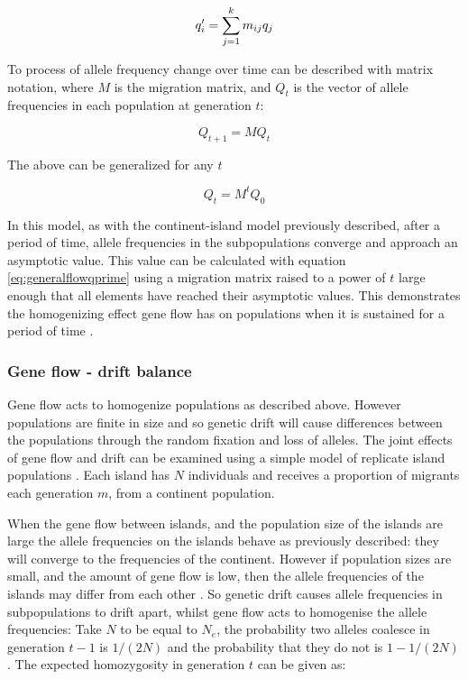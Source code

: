 \begin{equation} \label{eq:generalflowqprime}
q\sp{\prime}_i=\sum_{j=1}^k m_{ij}q_{j}
\end{equation}

To process of allele frequency change over time can be described with matrix notation, where $M$ is the migration matrix, and $Q_t$ is the vector of allele frequencies in each population at generation $t$:

\begin{equation}
Q_{t+1} = MQ_t
\end{equation}

The above can be generalized for any $t$

\begin{equation}
Q_t=M^tQ_0
\end{equation}

\parencite{Hedrick2010}

In this model, as with the continent-island model previously described, after a period of time, allele frequencies in the subpopulations converge and approach an asymptotic value.
This value can be calculated with equation \ref{eq:generalflowqprime} using a migration matrix raised to a power of $t$ large enough that all elements have reached their asymptotic values.
This demonstrates the homogenizing effect gene flow has on populations when it is sustained for a period of time \parencite{Charlesworth2010,Hedrick2010}.


\subsubsection{Gene flow - drift balance}

Gene flow acts to homogenize populations as described above.
However populations are finite in size and so genetic drift will cause differences between the populations through the random fixation and loss of alleles.
The joint effects of gene flow and drift can be examined using a simple model of replicate island populations \parencite{Wright1940}.
Each island has $N$ individuals and receives a proportion of migrants each generation $m$, from a continent population.

When the gene flow between islands, and the population size of the islands are large the allele frequencies on the islands behave as previously described: they will converge to the frequencies of the continent.
However if population sizes are small, and the amount of gene flow is low, then the allele frequencies of the islands may differ from each other \parencite{Hedrick2010}.
So genetic drift causes allele frequencies in subpopulations to drift apart, whilst gene flow acts to homogenise the allele frequencies:
Take $N$ to be equal to $N_e$, the probability two alleles coalesce in generation $t-1$ is $1/(2N)$ and the probability that they do not is $1-1/(2N)$ \parencite{Hedrick2010}. 
The expected homozygosity in generation $t$ can be given as:

